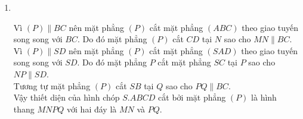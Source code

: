 \begin{bt}
{\begin{enumerate}
\item \ 
\begin{center}
\end{center}

Vì $(P)\parallel BC$ nên mặt phẳng $(P)$ cắt mặt phẳng $(ABC)$ theo giao tuyến song song với $BC$. Do đó mặt phẳng $(P)$ cắt $CD$ tại $N$ sao cho $MN\parallel BC$.\\
Vì $(P)\parallel SD$ nên mặt phẳng $(P)$ cắt mặt phẳng $(SAD)$ theo giao tuyến song song với $SD$. Do đó mặt phẳng  $P$ cắt mặt phẳng $SC$ tại $P$ sao cho $NP \parallel SD$.\\
Tương tự mặt phẳng $(P)$ cắt $SB$ tại $Q$ sao cho $PQ\parallel BC$.\\
Vậy thiết diện của hình chóp $S.ABCD$ cắt bởi mặt phẳng $(P)$ là hình thang $MNPQ$ với hai đáy là $MN$ và $PQ$. 
\end{enumerate}
}
\end{bt}




